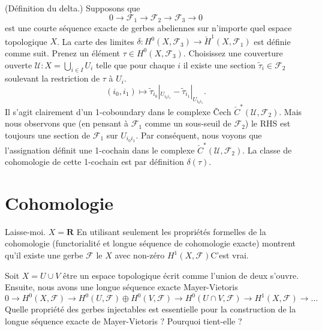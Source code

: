 \begin{definition}
\label{definition-delta}
(Définition du delta.) Supposons que
$$
0 \to {\mathcal F}_1 \to {\mathcal F}_2 \to {\mathcal F}_3 \to 0
$$
est une courte séquence exacte de gerbes abeliennes sur n'importe quel espace
topologique $X$. La
carte des limites $\delta : H^0(X, {\mathcal F}_3) \to {\check H}^1(X,
{\mathcal F}_1)$ est définie comme suit. Prenez un élément $\tau \in H^0(X,
{\mathcal F}_3)$. Choisissez une couverture ouverte ${\mathcal U} : X =
\bigcup_{i\in I} U_i$ telle que pour chaque $i$ il existe une section
$\tilde \tau_i \in {\mathcal F}_2$ soulevant la restriction de $\tau$ à $U_i$.
$$
(i_0, i_1) \longmapsto
\tilde \tau_{i_0}|_{U_{i_0i_1}} - \tilde \tau_{i_1}|_{U_{i_0i_1}}.
$$
Il s'agit clairement d'un 1-coboundary dans le complexe {\v
C}ech ${\check C}^\ast({\mathcal U}, {\mathcal F}_2)$. Mais nous observons que
(en pensant à ${\mathcal F}_1$ comme un sous-seuil de ${\mathcal F}_2$) le
RHS est toujours une section de ${\mathcal F}_1$ sur $U_{i_0i_1}$.
Par conséquent, nous voyons que l'assignation définit une 1-cochain
dans le complexe ${\check C}^\ast({\mathcal U}, {\mathcal F}_2)$. La classe
de cohomologie de cette 1-cochain est par définition {\it $\delta(\tau)$}.
\end{definition}



\section{Cohomologie}
\label{section-cohomology}

\begin{exercise}
\label{exercise-cohomology-not-zero}
Laisse-moi. $X = \mathbf{R}$ En utilisant seulement les
propriétés formelles de la cohomologie (functorialité et longue
séquence de cohomologie exacte) montrent qu'il existe
une gerbe $\mathcal{F}$ le $X$ avec non-zéro $H^1(X, \mathcal{F})$C'est vrai.
\end{exercise}

\begin{exercise}
\label{exercise-mayer-vietoris}
Soit $X = U \cup V$ être un espace topologique écrit
comme l'union de deux s'ouvre. Ensuite, nous avons une
longue séquence exacte Mayer-Vietoris
$$
0 \to
H^0(X, \mathcal{F}) \to
H^0(U, \mathcal{F}) \oplus H^0(V, \mathcal{F}) \to
H^0(U \cap V, \mathcal{F}) \to
H^1(X, \mathcal{F}) \to \ldots
$$
Quelle propriété des gerbes injectables est essentielle pour la construction de
la longue séquence exacte de Mayer-Vietoris ? Pourquoi tient-elle ?
\end{exercise}

